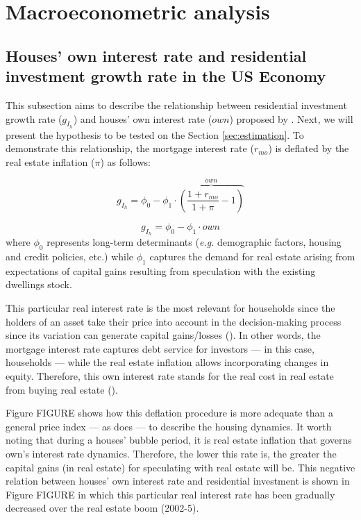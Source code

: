 \section{Macroeconometric analysis}\label{sec:VECM}

\subsection{Houses' own interest rate and residential investment growth rate in the US	Economy}\label{sec:own}

This subsection aims to describe the relationship between residential investment growth rate ($g_{I_h}$) and houses' own interest rate ($own$) proposed by \textcite{teixeira_crescimento_2015}. 
Next, we will present the hypothesis to be tested on the Section \ref{sec:estimation}. To demonstrate this relationship, the mortgage interest rate ($r_{mo}$) is deflated by the real estate inflation ($\pi$) as follows:

$$
g_{I_h} = \phi_0 - \phi_1\cdot \overbrace{\left(\frac{1+r_{mo}}{1+\pi} - 1\right)}^{own}
$$


\begin{equation}
g_{I_h} = \phi_0 - \phi_1\cdot own
\end{equation}
where $\phi_0$ represents long-term determinants (\textit{e.g.} demographic factors, housing and credit policies, etc.) while $\phi_1$ captures the demand for real estate arising from expectations of capital gains resulting from speculation with the existing dwellings stock. 

This particular real interest rate is the most relevant for households since the holders of an asset take their price into account in the decision-making process since its variation can generate capital gains/losses (\cite[p.~114]{teixeira_crescimento_2015}).
In other words, the mortgage interest rate captures debt service for investors --- in this case, households --- while the real estate inflation allows incorporating changes in equity. Therefore, this own interest rate stands for the real cost in real estate from buying real estate  (\cite[p.~53]{teixeira_crescimento_2015}).

Figure FIGURE shows how this deflation procedure is more adequate than a general price index --- as \textcite[p.~143--6]{fair_macroeconometric_2013} does --- to describe the housing dynamics. It worth noting that during a houses' bubble period, it is real estate inflation that governs own's interest rate dynamics.
Therefore, the lower this rate is, the greater the capital gains (in real estate) for speculating with real estate will be. This negative relation between houses' own interest rate and residential investment is shown in Figure FIGURE in which this particular real interest rate has been gradually decreased over the real estate boom (2002-5).

